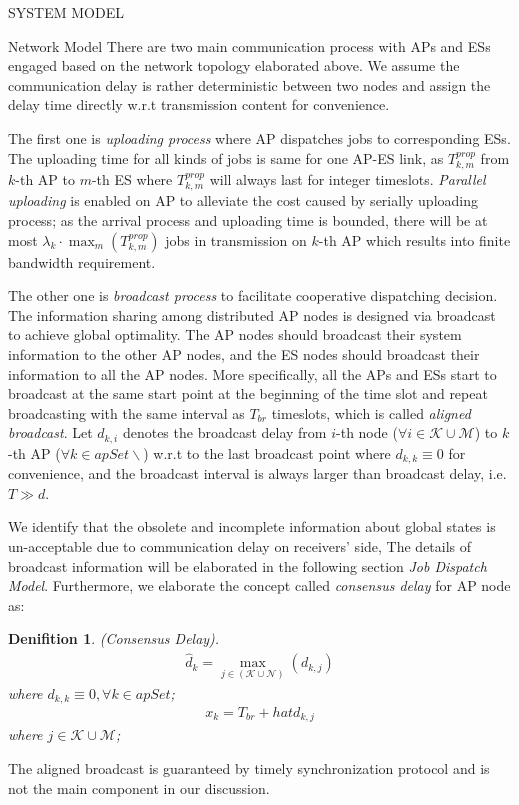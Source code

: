 \documentclass[10pt, conference, letterpaper]{IEEEtran}
\newtheorem{definition}{Denifition}
\newcommand{\apSet}{\mathcal{K}}
\newcommand{\esSet}{\mathcal{M}}
\begin{document}
\begin{section}{SYSTEM MODEL}
\begin{subsection}{Network Model}
            There are two main communication process with APs and ESs engaged based on the network topology elaborated above. We assume the communication delay is rather deterministic between two nodes and assign the delay time directly w.r.t transmission content for convenience.

            The first one is \emph{uploading process} where AP dispatches jobs to corresponding ESs. The uploading time for all kinds of jobs is same for one AP-ES link, as $T^{prop}_{k,m}$ from $k$-th AP to $m$-th ES where $T^{prop}_{k,m}$ will always last for integer timeslots. \emph{Parallel uploading} is enabled on AP to alleviate the cost caused by serially uploading process; as the arrival process and uploading time is bounded, there will be at most $\lambda_k \cdot \max_m(T^{prop}_{k,m})$ jobs in transmission on $k$-th AP which results into finite bandwidth requirement.
            
            The other one is \emph{broadcast process} to facilitate cooperative dispatching decision.
            The information sharing among distributed AP nodes is designed via broadcast to achieve global optimality. The AP nodes should broadcast their system information to the other AP nodes, and the ES nodes should broadcast their information to all the AP nodes. More specifically, all the APs and ESs start to broadcast at the same start point at the beginning of the time slot and repeat broadcasting with the same interval as $T_{br}$ timeslots, which is called \emph{aligned broadcast}. Let $d_{k,i}$ denotes the broadcast delay from $i$-th node ($\forall i \in \apSet\cup\esSet$) to $k$-th AP ($\forall k \in apSet\backslash$) w.r.t to the last broadcast point where $d_{k,k} \equiv 0$ for convenience, and the broadcast interval is always larger than broadcast delay, i.e. $T \gg d$.

            We identify that the obsolete and incomplete information about global states is un-acceptable due to communication delay on receivers' side,
            The details of  broadcast information will be elaborated in the following section \emph{Job Dispatch Model}.
            Furthermore, we elaborate the concept called \emph{consensus delay} for AP node as:
            \begin{definition}
                (Consensus Delay).
                \begin{align}
                    \hat{d}_k = \max_{j\in(\apSet \cup \mathcal{N})}(d_{k,j})
                \end{align}
                where $d_{k,k} \equiv 0, \forall k \in apSet$;
                \begin{align}
                    x_{k} = T_{br} + hat{d}_{k,j}
                \end{align}
                where $j \in \apSet \cup \esSet$;
            \end{definition}
            The aligned broadcast is guaranteed by timely synchronization protocol and is not the main component in our discussion.
        \end{subsection}


\end{section}
\end{document}
